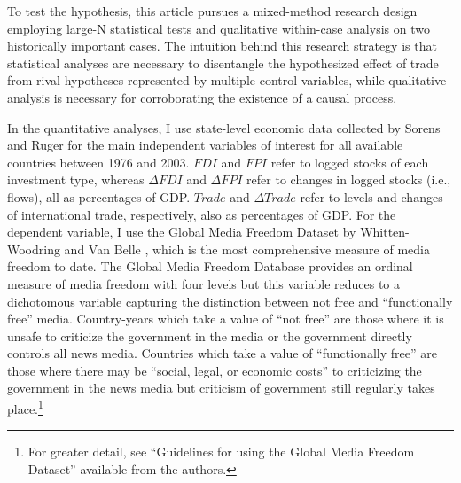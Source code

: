 \documentclass[12pt,a4paper]{article}\usepackage[]{graphicx}\usepackage[]{color}
\begin{document}
To test the hypothesis, this article pursues a mixed-method research design employing large-N statistical tests and qualitative within-case analysis on two historically important cases. The intuition behind this research strategy is that statistical analyses are necessary to disentangle the hypothesized effect of trade from rival hypotheses represented by multiple control variables, while qualitative analysis is necessary for corroborating the existence of a causal process.

In the quantitative analyses, I use state-level economic data collected by Sorens and Ruger \parencite*{Sorens:wc} for the main independent variables of interest for all available countries between 1976 and 2003. $FDI$ and $FPI$ refer to logged stocks of each investment type, whereas $\Delta FDI$ and $\Delta FPI$ refer to changes in logged stocks (i.e., flows), all as percentages of GDP. $Trade$ and $\Delta Trade$ refer to levels and changes of international trade, respectively, also as percentages of GDP.   For the dependent variable, I use the Global Media Freedom Dataset by Whitten-Woodring and Van Belle \parencites*{van2000press}{Belle:1997wo}, which is the most comprehensive measure of media freedom to date. The Global Media Freedom Database provides an ordinal measure of media freedom with four levels but this variable reduces to a dichotomous variable capturing the distinction between not free and ``functionally free'' media. Country-years which take a value of ``not free'' are those where it is unsafe to criticize the government in the media or the government directly controls all news media. Countries which take a value of ``functionally free'' are those where there may be ``social, legal, or economic costs'' to criticizing the government in the news media but criticism of government still regularly takes place.\footnote{For greater detail, see ``Guidelines for using the Global Media Freedom Dataset'' available from the authors.}
\end{document}
